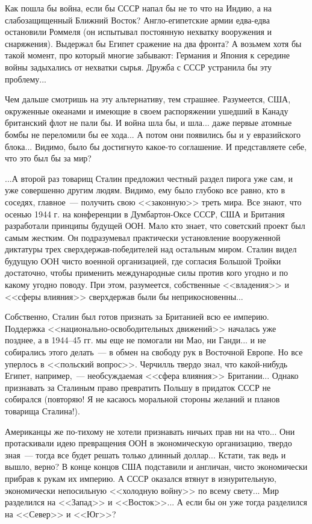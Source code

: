 \documentclass{scrbook}
\newcommand{\flqq}{<<}
\newcommand{\frqq}{>>}
\newcommand{\mdash}{~--- }
\newcommand{\ndash}{--}
\newcommand{\commamdash}{~--- } %
\begin{document}
Как пошла бы война, если бы СССР напал бы не то что на Индию, а на слабозащищенный Ближний Восток? Англо-египетские армии едва-едва остановили Роммеля (он испытывал постоянную нехватку вооружения и снаряжения). Выдержал бы Египет сражение на два фронта? А возьмем хотя бы такой момент, про который многие забывают: Германия и Япония к середине войны задыхались от нехватки сырья. Дружба с СССР устранила бы эту проблему...

Чем дальше смотришь на эту альтернативу, тем страшнее. Разумеется, США, окруженные океанами и имеющие в своем распоряжении ушедший в Канаду британский флот не пали бы. И война шла бы, и шла... даже первые атомные бомбы не переломили бы ее хода... А потом они появились бы и у евразийского блока... Видимо, было бы достигнуто какое-то соглашение. И представляете себе, что это был бы за мир?

...А второй раз товарищ Сталин предложил честный раздел пирога уже сам, и уже совершенно другим людям. Видимо, ему было глубоко все равно, кто в соседях, главное{\mdash}получить свою {\flqq}законную{\frqq} треть мира. Все знают, что осенью 1944 г. на конференции в Думбартон-Оксе СССР, США и Британия разработали принципы будущей ООН. Мало кто знает, что советский проект был самым жестким. Он подразумевал практически установление вооруженной диктатуры трех сверхдержав-победителей над остальным миром. Сталин видел будущую ООН чисто военной организацией, где согласия Большой Тройки достаточно, чтобы применить международные силы против кого угодно и по какому угодно поводу. При этом, разумеется, собственные {\flqq}владения{\frqq} и {\flqq}сферы влияния{\frqq} сверхдержав были бы неприкосновенны...

Собственно, Сталин был готов признать за Британией всю ее империю. Поддержка {\flqq}национально-освободительных движений{\frqq} началась уже позднее, а в 1944{\ndash}45 гг. мы еще не помогали ни Мао, ни Ганди... и не собирались этого делать{\mdash}в обмен на свободу рук в Восточной Европе. Но все уперлось в {\flqq}польский вопрос{\frqq}. Черчилль твердо знал, что какой-нибудь Египет, например,{\commamdash}необсуждаемая {\flqq}сфера влияния{\frqq} Британии... Однако признавать за Сталиным право превратить Польшу в придаток СССР не собирался (повторяю! Я не касаюсь моральной стороны желаний и планов товарища Сталина!).

Американцы же по-тихому не хотели признавать ничьих прав ни на что... Они протаскивали идею превращения ООН в экономическую организацию, твердо зная{\mdash}тогда все будет решать только длинный доллар... Кстати, так ведь и вышло, верно? В конце концов США подставили и англичан, чисто экономически прибрав к рукам их империю. А СССР оказался втянут в изнурительную, экономически непосильную {\flqq}холодную войну{\frqq} по всему свету... Мир разделился на {\flqq}Запад{\frqq} и {\flqq}Восток{\frqq}... А если бы он уже тогда разделился на {\flqq}Север{\frqq} и {\flqq}Юг{\frqq}?
\end{document}
